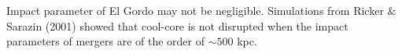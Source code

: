 Impact parameter of El Gordo may not be negligible. 
Simulations from Ricker \& Sarazin (2001) showed that cool-core is not
disrupted  when the impact parameters of mergers are of the order of $\sim 500$ kpc.   
